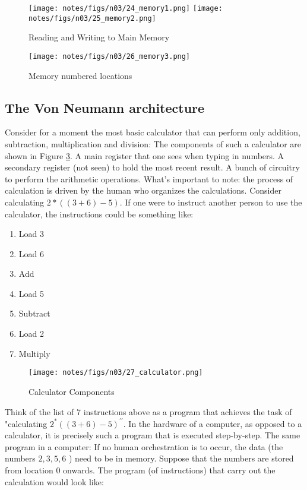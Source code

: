 \documentclass[main.tex]{subfiles}
\begin{document}
\begin{figure}
    \centering
    \texttt{[image: notes/figs/n03/24\_memory1.png]}
    \texttt{[image: notes/figs/n03/25\_memory2.png]}
    \caption{Reading and Writing to Main Memory}
    \label{fig24:read_write_memory}
\end{figure}

\begin{figure}
    \centering
    \texttt{[image: notes/figs/n03/26\_memory3.png]}
    \caption{Memory numbered locations}
    \label{fig26:memory_numbered_locations}
\end{figure}

\subsection{The Von Neumann architecture}

Consider for a moment the most basic calculator that can perform only addition, subtraction, multiplication and division: The components of such a calculator are shown in Figure \ref{fig27:calculator_components}. A main register that one sees when typing in numbers. A secondary register (not seen) to hold the most recent result. A bunch of circuitry to perform the arithmetic operations. What's important to note: the process of calculation is driven by the human who organizes the calculations. Consider calculating $2 *((3+6)-5)$. If one were to instruct another person to use the calculator, the instructions could be something like:

\begin{enumerate}
    \item Load 3
    \item Load 6
    \item Add
    \item Load 5
    \item Subtract
    \item Load 2
    \item Multiply
\end{enumerate}

\begin{figure}
    \centering
    \texttt{[image: notes/figs/n03/27\_calculator.png]}
    \caption{Calculator Components}
    \label{fig27:calculator_components}
\end{figure}

Think of the list of 7 instructions above as a program that achieves the task of "calculating $2^{*}((3+6)-5)^{\prime \prime}$. In the hardware of a computer, as opposed to a calculator, it is precisely such a program that is executed step-by-step. The same program in a computer: If no human orchestration is to occur, the data (the numbers $2,3,5,6$ ) need to be in memory. Suppose that the numbers are stored from location 0 onwards. The program (of instructions) that carry out the calculation would look like:
\end{document}
